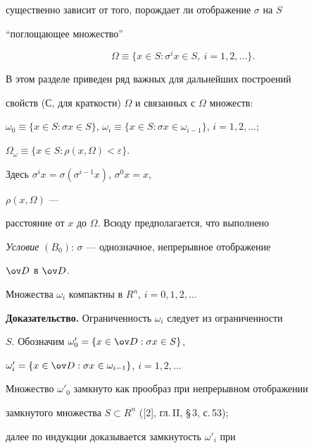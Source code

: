 существенно зависит от того, порождает ли отображение $\sigma$ на $S$ 


``поглощающее множество'' 


$$ 


\Omega\equiv\{x\in S:\sigma^i x\in S,\ i=1,2,\dotsc\}. 


$$ 


 


В этом разделе приведен ряд важных для дальнейших построений 


свойств (С, для краткости) $\Omega$ и связанных с $\Omega$ множеств: 


$\omega_0\equiv\{x\in S:\sigma x\in S\}$, $\omega_i\equiv\{x\in 


S:\sigma x\in \omega_{i-1}\}$, $i=1,2,\dotsc$; 


$\Omega_\omega\equiv\{x\in S:\rho(x,\Omega)<\varepsilon\}$. 


Здесь $\sigma^i x=\sigma(\sigma^{i-1}x)$, $\sigma^0x=x$, 


$\rho(x,\Omega)$ --- 


расстояние от $x$ до $\Omega$. Всюду предполагается, что выполнено 


\medskip 


 


{\it Условие} $(B_0)$: $\sigma$ --- однозначное, непрерывное отображение 


$\ov D$ в $\ov D$. 


 


\begin{pty} 


Множества $\omega_i$ компактны в $R^n$, $i=0,1,2,\dotsc$ 


\end{pty} 


 


{\bf Доказательство.} Ограниченность $\omega_i$ следует из ограниченности 


$S$. Обозначим $\omega'_0=\{x\in\ov D:\sigma x\in S\}$, 


$\omega'_i=\{x\in\ov D:\sigma x\in\omega_{i-1}\}$, $i=1,2,\dotsc$ 


Множество $\omega'_0$ замкнуто как прообраз при непрерывном отображении 


замкнутого множества $S\subset R^n$ ([2], гл.\,II, \S\,3, с.\,53); 


далее по индукции доказывается замкнутость $\omega'_i$ при 


